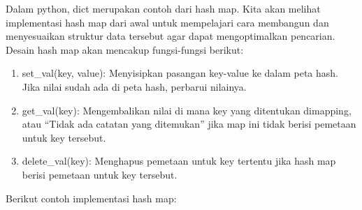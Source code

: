 Dalam python, dict merupakan contoh dari hash map. Kita akan melihat implementasi hash map dari awal untuk mempelajari cara membangun dan menyesuaikan struktur data tersebut agar dapat mengoptimalkan pencarian.
Desain hash map akan mencakup fungsi-fungsi berikut:
\begin{enumerate}

\item set_val(key, value): Menyisipkan pasangan key-value ke dalam peta hash. Jika nilai sudah ada di peta hash, perbarui nilainya.

\item get_val(key): Mengembalikan nilai di mana key yang ditentukan dimapping, atau “Tidak ada catatan yang ditemukan” jika map ini tidak berisi pemetaan untuk key tersebut.

\item delete_val(key): Menghapus pemetaan untuk key tertentu jika hash map berisi pemetaan untuk key tersebut.
\end{enumerate}
Berikut contoh implementasi hash map:

